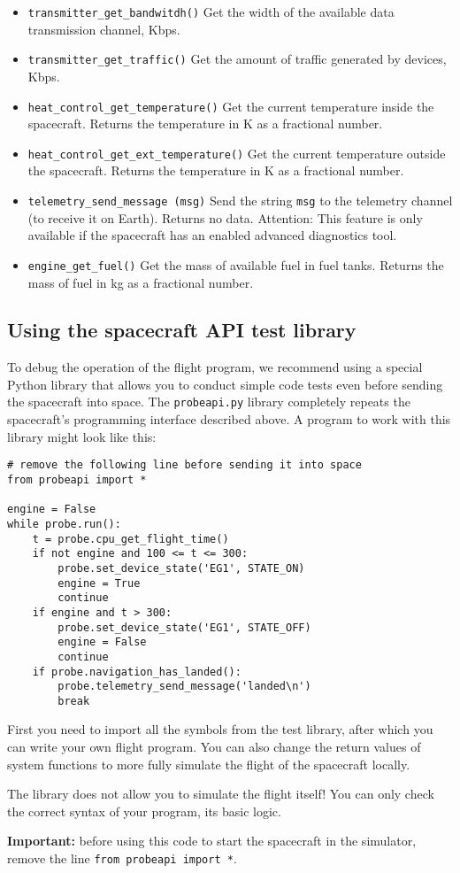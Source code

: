 \documentclass[12pt,a4paper]{article}
\begin{document}
\begin{itemize}
\item \verb'transmitter_get_bandwitdh()' Get the width of the available data transmission channel, Kbps.

\item \verb'transmitter_get_traffic()' Get the amount of traffic generated by devices, Kbps.

\item \verb'heat_control_get_temperature()' Get the current temperature inside the spacecraft. Returns the temperature in K as a fractional number.

\item \verb'heat_control_get_ext_temperature()' Get the current temperature outside the spacecraft. Returns the temperature in K as a fractional number.

\item \verb'telemetry_send_message (msg)' Send the string \verb'msg' to the telemetry channel (to receive it on Earth). Returns no data. Attention: This feature is only available if the spacecraft has an enabled advanced diagnostics tool.

\item \verb'engine_get_fuel()' Get the mass of available fuel in fuel tanks. Returns the mass of fuel in kg as a fractional number.

\end{itemize}

\subsection*{Using the spacecraft API test library}

To debug the operation of the flight program, we recommend using a special Python library that allows you to conduct simple code tests even before sending the spacecraft into space. The \verb'probeapi.py' library completely repeats the spacecraft's programming interface described above. A program to work with this library might look like this:

\begin{verbatim}
# remove the following line before sending it into space
from probeapi import *

engine = False
while probe.run():
    t = probe.cpu_get_flight_time()
    if not engine and 100 <= t <= 300:
        probe.set_device_state('EG1', STATE_ON)
        engine = True
        continue
    if engine and t > 300:
        probe.set_device_state('EG1', STATE_OFF)
        engine = False
        continue
    if probe.navigation_has_landed():
        probe.telemetry_send_message('landed\n')
        break
\end{verbatim}

First you need to import all the symbols from the test library, after which you can write your own flight program. You can also change the return values of system functions to more fully simulate the flight of the spacecraft locally.

The library does not allow you to simulate the flight itself! You can only check the correct syntax of your program, its basic logic.

\textbf{Important:} before using this code to start the spacecraft in the simulator, remove the line
\verb'from probeapi import *'.
\end{document}
